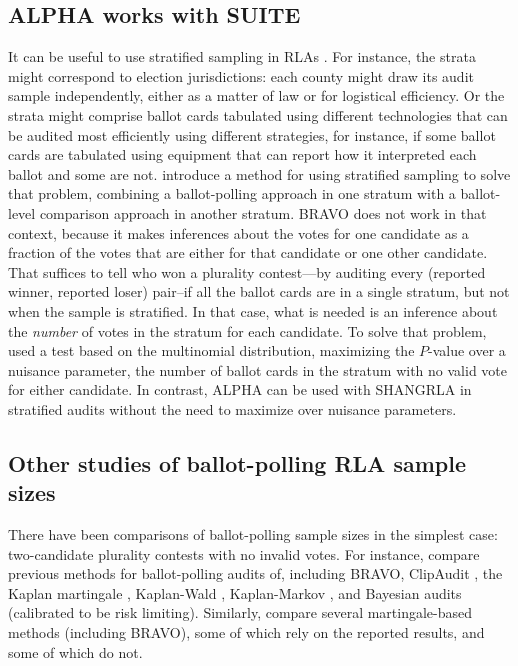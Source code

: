 \documentclass[12pt,runningheads]{llncs}
\begin{document}
{\subsection{ALPHA works with SUITE}
It can be useful to use stratified sampling in RLAs \cite{stark08a,higginsEtal11,ottoboniEtal18,stark20}.
For instance, the strata might correspond to election jurisdictions: each county might draw its audit sample independently, 
either as a matter of law or for logistical efficiency.
Or the strata might comprise ballot cards tabulated using different technologies that can be audited most efficiently
using different strategies, for instance, if some ballot cards are tabulated using equipment that can report how it
interpreted each ballot and some are not.
\cite{ottoboniEtal18} introduce a method for using stratified sampling to solve that problem, combining a ballot-polling
approach in one stratum with a ballot-level comparison approach in another stratum.
BRAVO does not work in that context, because it makes inferences about the votes for one candidate as a fraction of
the votes that are either for that candidate or one other candidate.
That suffices to tell who won a plurality contest---by auditing every (reported winner, reported loser) pair--if all the ballot cards are in a single stratum, but not when the sample is stratified.
In that case, what is needed is an inference about the \emph{number} of votes in the stratum for each candidate.
To solve that problem, \cite{ottoboniEtal18} used a test based on the multinomial distribution, maximizing the $P$-value
over a nuisance parameter, the number of ballot cards in the stratum with no valid vote for either candidate.
In contrast, ALPHA can be used with SHANGRLA in stratified audits without the need to maximize over nuisance
parameters.

\subsection{Other studies of ballot-polling RLA sample sizes}
There have been comparisons of ballot-polling sample sizes in the simplest case:
two-candidate plurality contests with no invalid votes.
For instance,
\cite{huangEtal20} compare previous methods for ballot-polling audits of, including BRAVO, ClipAudit \cite{rivest17}, the Kaplan martingale \cite{stark20}, 
Kaplan-Wald \cite{stark09b,stark20}, Kaplan-Markov \cite{stark09b,stark20}, and Bayesian audits \cite{rivestShen12,rivest18} 
(calibrated to be risk limiting).
Similarly, \cite{waudby-smithEtal21} compare several martingale-based methods (including BRAVO), some of which
rely on the reported results, and some of which do not.

}
\end{document}
